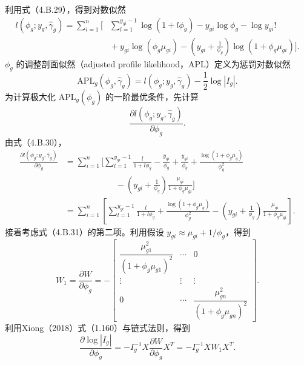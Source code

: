 利用式（4.B.29），得到对数似然
\begin{equation}
\begin{aligned}
l(\phi_g;y_g,\widehat\gamma_g)
=\sum_{i=1}^{n}\biggl[&\sum_{l=1}^{y_{gi}-1}\log(1+l\phi_g)
-y_{gi}\log\phi_g-\log y_{gi}!\\
&{}+y_{gi}\log(\phi_g\mu_{gi})
-\left(y_{gi}+\frac1{\phi_g}\right)\log(1+\phi_g\mu_{gi})\biggr].
\end{aligned}\tag{4.B.30}
\end{equation}
$\phi_g$ 的调整剖面似然（adjusted profile likelihood，APL）定义为惩罚对数似然
\begin{equation}
\mathrm{APL}_g(\phi_g,\widehat\gamma_g)
=l(\phi_g;y_g,\widehat\gamma_g)-\frac12\log|I_g|.\tag{4.B.31}
\end{equation}
为计算极大化 $\mathrm{APL}_g(\phi_g)$ 的一阶最优条件，先计算
\[
\frac{\partial l(\phi_g;y_g,\widehat\gamma_g)}{\partial\phi_g}.
\]
由式（4.B.30），
\begin{equation}
\begin{aligned}
\frac{\partial l(\phi_g;y_g,\widehat\gamma_g)}{\partial\phi_g}
&=\sum_{i=1}^{n}\biggl[\sum_{l=1}^{y_{gi}-1}\frac l{1+l\phi_g}
 -\frac{y_{gi}}{\phi_g}+\frac{y_{gi}}{\phi_g}
 +\frac{\log(1+\phi_g\mu_g)}{\phi_g^2}\\
&\hspace{6em}{}-\left(y_{gi}+\frac1{\phi_g}\right)
 \frac{\mu_{gi}}{1+\phi_g\mu_{gi}}\biggr]\\
&=\sum_{i=1}^{n}\left[\sum_{l=1}^{y_{gi}-1}\frac l{1+l\phi_g}
 +\frac{\log(1+\phi_g\mu_g)}{\phi_g^2}
 -\left(y_{gi}+\frac1{\phi_g}\right)\frac{\mu_{gi}}{1+\phi_g\mu_{gi}}\right].
\end{aligned}\tag{4.B.32}
\end{equation}
接着考虑式（4.B.31）的第二项。利用假设 $y_{gi}\approx\mu_{gi}+1/\phi_g$，得到
\begin{equation}
W_1=\frac{\partial W}{\partial\phi_g}=
-\begin{bmatrix}
\dfrac{\mu_{g1}^2}{(1+\phi_g\mu_{g1})^2}&\cdots&0\\
\vdots&\vdots&\vdots\\
0&\cdots&\dfrac{\mu_{gn}^2}{(1+\phi_g\mu_{gn})^2}
\end{bmatrix}.\tag{4.B.33}
\end{equation}
利用Xiong（2018）式（1.160）与链式法则，得到
\begin{equation}
\frac{\partial\log|I_g|}{\partial\phi_g}
=-I_g^{-1}X\frac{\partial W}{\partial\phi_g}X^T
=-I_g^{-1}XW_1X^T.\tag{4.B.34}
\end{equation}
